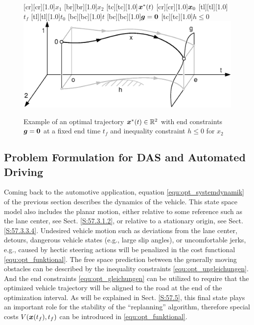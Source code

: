 \begin{figure}[ht]
[cr][cr][1.0]{$x_1$}
[br][br][1.0]{$x_2$}
[tc][tc][1.0]{$\boldsymbol{x}^\ast(t)$}
[cr][cr][1.0]{$\boldsymbol{x}_0$}
[tl][tl][1.0]{$t_f$}
[tl][tl][1.0]{$t_0$}
[bc][bc][1.0]{$t$}
[bc][bc][1.0]{$\boldsymbol{g}=\boldsymbol{0}$}
[tc][tc][1.0]{$h\leq0$}
	\centering
  	\includegraphics[width=1.\textwidth,clip, trim = 0cm 0cm 0cm 0cm]{pics/2_Darstellung_dynamische_Optimierung_endvorgabe.eps}
  	\caption[Example of an optimal trajectory]{Example of an optimal trajectory $\boldsymbol{x}^\ast (t)\in \mathbb{R}^2$ with end constraints $\boldsymbol{g}=\boldsymbol{0}$ at a fixed end time $t_f$ and inequality constraint $h\leq 0$ for $x_2$}
    \label{fig:dynamische_Optimierung_endvorgabe}
\end{figure}

\subsection{Problem Formulation for DAS and Automated Driving}\label{S:57.2.2}
Coming back to the automotive application, equation \eqref{equ:opt_systemdynamik} of the previous section describes the dynamics of the vehicle. This state space model also includes the planar motion, either relative to some reference such as the lane center, see Sect. \ref{S:57.3.1.2}, or relative to a stationary origin, see Sect. \ref{S:57.3.3.4}. Undesired vehicle motion such as deviations from the lane center, detours, dangerous vehicle states (e.g., large slip angles), or uncomfortable jerks, e.g., caused by hectic steering actions will be penalized in the cost functional \eqref{equ:opt_funktional}. The free space prediction between the generally moving obstacles can be described by the inequality constraints \eqref{equ:opt_ungleichungen}. And the end constraints \eqref{equ:opt_gleichungen} can be utilized to require that the optimized vehicle trajectory will be aligned to the road at the end of the optimization interval. As will be explained in Sect. \ref{S:57.5}, this final state plays an important role for the stability of the “replanning” algorithm, therefore special costs 
$V(\boldsymbol{x}(t_f), t_f)$ can be introduced in \eqref{equ:opt_funktional}. 

